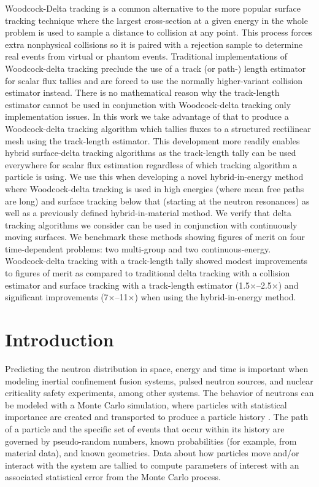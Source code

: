 Woodcock-Delta tracking is a common alternative to the more popular surface tracking technique where the largest cross-section at a given energy in the whole problem is used to sample a distance to collision at any point.
This process forces extra nonphysical collisions so it is paired with a rejection sample to determine real events from virtual or phantom events.
Traditional implementations of Woodcock-delta tracking preclude the use of a track (or path-) length estimator for scalar flux tallies and are forced to use the normally higher-variant collision estimator instead.
There is no mathematical reason why the track-length estimator cannot be used in conjunction with Woodcock-delta tracking only implementation issues. 
In this work we take advantage of that to produce a Woodcock-delta tracking algorithm which tallies fluxes to a structured rectilinear mesh using the track-length estimator.
This development more readily enables hybrid surface-delta tracking algorithms as the track-length tally can be used everywhere for scalar flux estimation regardless of which tracking algorithm a particle is using.
We use this when developing a novel hybrid-in-energy method where Woodcock-delta tracking is used in high energies (where mean free paths are long) and surface tracking below that (starting at the neutron resonances) as well as a previously defined hybrid-in-material method.
We verify that delta tracking algorithms we consider can be used in conjunction with continuously moving surfaces.
We benchmark these methods showing figures of merit on four time-dependent problems: two multi-group and two continuous-energy.
Woodcock-delta tracking with a track-length tally showed modest improvements to figures of merit as compared to traditional delta tracking with a collision estimator and surface tracking with a track-length estimator (\num{1.5}$\times$--\num{2.5}$\times$) and significant improvements (\num{7}$\times$--\num{11}$\times$) when using the hybrid-in-energy method.

\section{Introduction}

Predicting the neutron distribution in space, energy and time is important when modeling inertial confinement fusion systems, pulsed neutron sources, and nuclear criticality safety experiments, among other systems.
The behavior of neutrons can be modeled with a Monte Carlo simulation, where particles with statistical importance are created and transported to produce a particle history \cite{lewis_computational_1984}. 
The path of a particle and the specific set of events that occur within its history are governed by pseudo-random numbers, known probabilities (for example, from material data), and known geometries. Data about how
particles move and/or interact with the system are tallied to compute parameters of interest with an associated statistical error from the Monte Carlo process.


